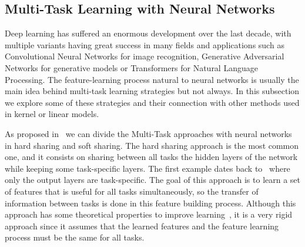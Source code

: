 


\subsection{Multi-Task Learning with Neural Networks}
Deep learning has suffered an enormous development over the last decade, with multiple variants having great success in many fields and applications such as Convolutional Neural Networks for image recognition, Generative Adversarial Networks for generative models or Transformers for Natural Language Processing. 
The feature-learning process natural to neural networks is usually the main idea behind multi-task learning strategies but not always.
In this subsection we explore some of these strategies and their connection with other methods used in kernel or linear models.

As proposed in~\cite{Ruder17a} we can divide the Multi-Task approaches with neural networks in hard sharing and soft sharing.
The hard sharing approach is the most common one, and it consists on sharing between all tasks the hidden layers of the network while keeping some task-specific layers. The first example dates back to~\cite{Caruana97} where only the output layers are task-specific. The goal of this approach is to learn a set of features that is useful for all tasks simultaneously, so the transfer of information between tasks is done in this feature building process. Although this approach has some theoretical properties to improve learning~\cite{baxter2000model}, it is a very rigid approach since it assumes that the learned features and the feature learning process must be the same for all tasks.

